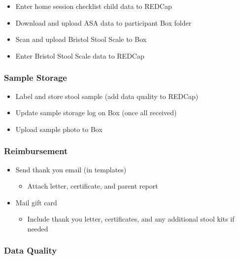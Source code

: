 \documentclass[]{book}
\providecommand{\tightlist}{%
  \setlength{\itemsep}{0pt}\setlength{\parskip}{0pt}}
\begin{document}
\begin{itemize}
\tightlist
\item
  Enter home session checklist child data to REDCap
\item
  Download and upload ASA data to participant Box folder
\item
  Scan and upload Bristol Stool Scale to Box
\item
  Enter Bristol Stool Scale data to REDCap
\end{itemize}

\hypertarget{sample-storage-1}{%
\subsubsection{Sample Storage}\label{sample-storage-1}}

\begin{itemize}
\tightlist
\item
  Label and store stool sample (add data quality to REDCap)
\item
  Update sample storage log on Box (once all received)
\item
  Upload sample photo to Box
\end{itemize}

\hypertarget{reimbursement}{%
\subsubsection{Reimbursement}\label{reimbursement}}

\begin{itemize}
\tightlist
\item
  Send thank you email (in templates)

  \begin{itemize}
  \tightlist
  \item
    Attach letter, certificate, and parent report
  \end{itemize}
\item
  Mail gift card

  \begin{itemize}
  \tightlist
  \item
    Include thank you letter, certificates, and any additional stool kits if needed
  \end{itemize}
\end{itemize}

\hypertarget{data-quality}{%
\subsubsection{Data Quality}\label{data-quality}}
\end{document}
